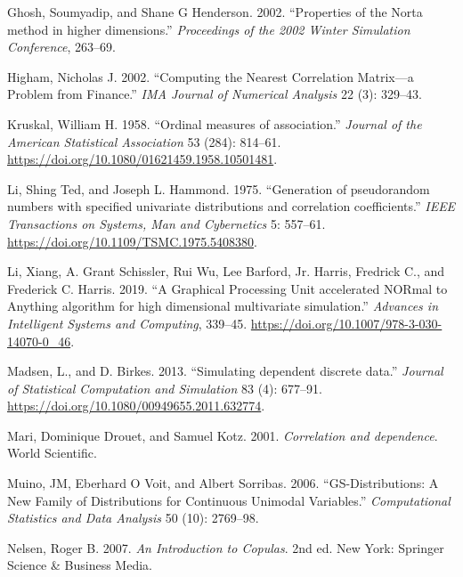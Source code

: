 \documentclass{article}
\newlength{\cslhangindent}
\newenvironment{CSLReferences}[2] %
 {%
  \setlength{\parindent}{0pt}
  \ifodd #1 \everypar{\setlength{\hangindent}{\cslhangindent}}\ignorespaces\fi
  \ifnum #2 > 0
  \setlength{\parskip}{#2\baselineskip}
  \fi
 }%
 {}
\begin{document}
\begin{CSLReferences}{1}{0}
\leavevmode{}%
Ghosh, Soumyadip, and Shane G Henderson. 2002. {``{Properties of the
Norta method in higher dimensions}.''} \emph{Proceedings of the 2002
Winter Simulation Conference}, 263--69.

\leavevmode{}%
Higham, Nicholas J. 2002. {``Computing the Nearest Correlation
Matrix---a Problem from Finance.''} \emph{IMA Journal of Numerical
Analysis} 22 (3): 329--43.

\leavevmode{}%
Kruskal, William H. 1958. {``{Ordinal measures of association}.''}
\emph{Journal of the American Statistical Association} 53 (284):
814--61. \url{https://doi.org/10.1080/01621459.1958.10501481}.

\leavevmode{}%
Li, Shing Ted, and Joseph L. Hammond. 1975. {``{Generation of
pseudorandom numbers with specified univariate distributions and
correlation coefficients}.''} \emph{IEEE Transactions on Systems, Man
and Cybernetics} 5: 557--61.
\url{https://doi.org/10.1109/TSMC.1975.5408380}.

\leavevmode{}%
Li, Xiang, A. Grant Schissler, Rui Wu, Lee Barford, Jr. Harris, Fredrick
C., and Frederick C. Harris. 2019. {``{A Graphical Processing Unit
accelerated NORmal to Anything algorithm for high dimensional
multivariate simulation}.''} \emph{Advances in Intelligent Systems and
Computing}, 339--45. \url{https://doi.org/10.1007/978-3-030-14070-0_46}.

\leavevmode{}%
Madsen, L., and D. Birkes. 2013. {``{Simulating dependent discrete
data}.''} \emph{Journal of Statistical Computation and Simulation} 83
(4): 677--91. \url{https://doi.org/10.1080/00949655.2011.632774}.

\leavevmode{}%
Mari, Dominique Drouet, and Samuel Kotz. 2001. \emph{{Correlation and
dependence}}. World Scientific.

\leavevmode{}%
Muino, JM, Eberhard O Voit, and Albert Sorribas. 2006.
{``GS-Distributions: A New Family of Distributions for Continuous
Unimodal Variables.''} \emph{Computational Statistics and Data Analysis}
50 (10): 2769--98.

\leavevmode{}%
Nelsen, Roger B. 2007. \emph{{An Introduction to Copulas}}. 2nd ed. New
York: Springer Science {\&} Business Media.


\end{CSLReferences}
\end{document}

